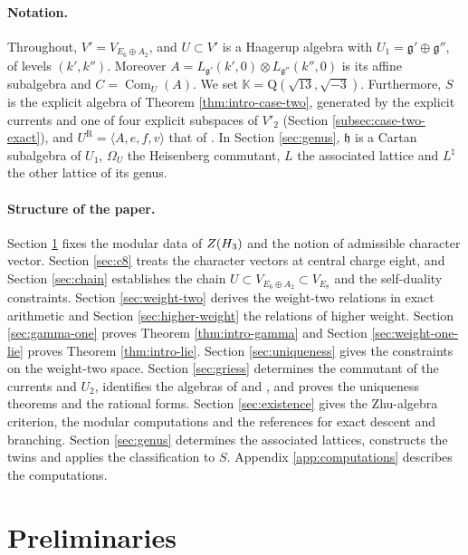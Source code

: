 \documentclass[leqno]{article}
\newcommand{\K}{\ensuremath{\mathbb{K}}}
\newcommand{\Q}{\mathrm{Q}}
\let\cal\relax
\newcommand{\cal}{\mathcal}
\newcommand{\la}{\langle}
\newcommand{\ra}{\rangle}
\newcommand{\ot}{\otimes}
\numberwithin{equation}{section}
\begin{document}
\paragraph{Notation.} Throughout, $V' = V_{E_6 \oplus A_2}$, and $U \subset V'$ is a Haagerup algebra with $U_1 = \mathfrak g' \oplus \mathfrak g''$, of levels $(k',k'')$. Moreover $A = L_{\mathfrak g'}(k',0) \ot L_{\mathfrak g''}(k'',0)$ is its affine subalgebra and $C = \operatorname{Com}_U(A)$. We set $\K = \Q(\sqrt{13},\sqrt{-3})$. Furthermore, $S$ is the explicit algebra of Theorem \ref{thm:intro-case-two}, generated by the explicit currents and one of four explicit subspaces of $V'_2$ (Section \ref{subsec:case-two-exact}), and $U^{\mathrm R} = \la A,e,f,v\ra$ that of \cite{Rie26}. In Section \ref{sec:genus}, $\mathfrak h$ is a Cartan subalgebra of $U_1$, $\Omega_U$ the Heisenberg commutant, $L$ the associated lattice and $L^\natural$ the other lattice of its genus.

\paragraph{Structure of the paper.} Section \ref{sec:preliminaries} fixes the modular data of $Z(\cal H_3)$ and the notion of admissible character vector. Section \ref{sec:c8} treats the character vectors at central charge eight, and Section \ref{sec:chain} establishes the chain $U \subset V_{E_6 \oplus A_2} \subset V_{E_8}$ and the self-duality constraints. Section \ref{sec:weight-two} derives the weight-two relations in exact arithmetic and Section \ref{sec:higher-weight} the relations of higher weight. Section \ref{sec:gamma-one} proves Theorem \ref{thm:intro-gamma} and Section \ref{sec:weight-one-lie} proves Theorem \ref{thm:intro-lie}. Section \ref{sec:uniqueness} gives the constraints on the weight-two space. Section \ref{sec:griess} determines the commutant of the currents and $U_2$, identifies the algebras of \cite{Jia26} and \cite{Rie26}, and proves the uniqueness theorems and the rational forms. Section \ref{sec:existence} gives the Zhu-algebra criterion, the modular computations and the references for exact descent and branching. Section \ref{sec:genus} determines the associated lattices, constructs the twins and applies the classification to $S$. Appendix \ref{app:computations} describes the computations.

\section{Preliminaries}
\label{sec:preliminaries}
\end{document}
